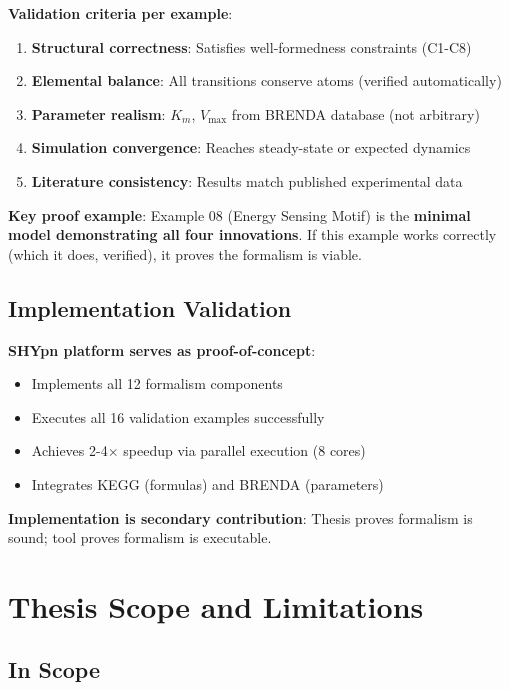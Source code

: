 \textbf{Validation criteria per example}:

\begin{enumerate}
    \item \textbf{Structural correctness}: Satisfies well-formedness constraints (C1-C8)
    \item \textbf{Elemental balance}: All transitions conserve atoms (verified automatically)
    \item \textbf{Parameter realism}: $K_m$, $V_{\max}$ from BRENDA database (not arbitrary)
    \item \textbf{Simulation convergence}: Reaches steady-state or expected dynamics
    \item \textbf{Literature consistency}: Results match published experimental data
\end{enumerate}

\textbf{Key proof example}: Example 08 (Energy Sensing Motif) is the \textbf{minimal model demonstrating all four innovations}. If this example works correctly (which it does, verified), it proves the formalism is viable.

\subsection{Implementation Validation}
\label{subsec:implementation-validation}

\textbf{SHYpn platform serves as proof-of-concept}:

\begin{itemize}
    \item Implements all 12 formalism components
    \item Executes all 16 validation examples successfully
    \item Achieves 2-4$\times$ speedup via parallel execution (8 cores)
    \item Integrates KEGG (formulas) and BRENDA (parameters)
\end{itemize}

\textbf{Implementation is secondary contribution}: Thesis proves formalism is sound; tool proves formalism is executable.

\section{Thesis Scope and Limitations}
\label{sec:scope-limitations}

\subsection{In Scope}
\label{subsec:in-scope}

